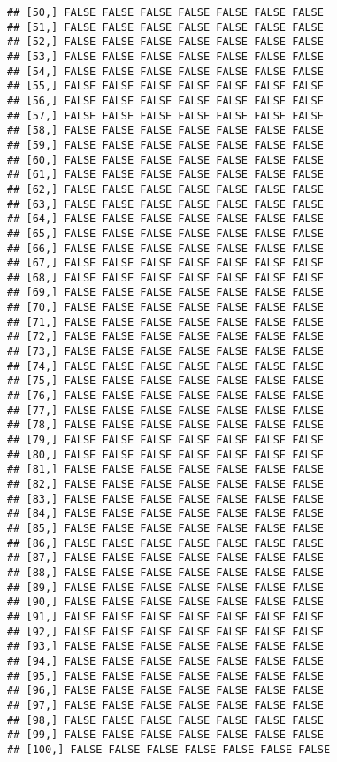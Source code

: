 \documentclass[
]{article}
\begin{document}
\begin{verbatim}
## [50,] FALSE FALSE FALSE FALSE FALSE FALSE FALSE
## [51,] FALSE FALSE FALSE FALSE FALSE FALSE FALSE
## [52,] FALSE FALSE FALSE FALSE FALSE FALSE FALSE
## [53,] FALSE FALSE FALSE FALSE FALSE FALSE FALSE
## [54,] FALSE FALSE FALSE FALSE FALSE FALSE FALSE
## [55,] FALSE FALSE FALSE FALSE FALSE FALSE FALSE
## [56,] FALSE FALSE FALSE FALSE FALSE FALSE FALSE
## [57,] FALSE FALSE FALSE FALSE FALSE FALSE FALSE
## [58,] FALSE FALSE FALSE FALSE FALSE FALSE FALSE
## [59,] FALSE FALSE FALSE FALSE FALSE FALSE FALSE
## [60,] FALSE FALSE FALSE FALSE FALSE FALSE FALSE
## [61,] FALSE FALSE FALSE FALSE FALSE FALSE FALSE
## [62,] FALSE FALSE FALSE FALSE FALSE FALSE FALSE
## [63,] FALSE FALSE FALSE FALSE FALSE FALSE FALSE
## [64,] FALSE FALSE FALSE FALSE FALSE FALSE FALSE
## [65,] FALSE FALSE FALSE FALSE FALSE FALSE FALSE
## [66,] FALSE FALSE FALSE FALSE FALSE FALSE FALSE
## [67,] FALSE FALSE FALSE FALSE FALSE FALSE FALSE
## [68,] FALSE FALSE FALSE FALSE FALSE FALSE FALSE
## [69,] FALSE FALSE FALSE FALSE FALSE FALSE FALSE
## [70,] FALSE FALSE FALSE FALSE FALSE FALSE FALSE
## [71,] FALSE FALSE FALSE FALSE FALSE FALSE FALSE
## [72,] FALSE FALSE FALSE FALSE FALSE FALSE FALSE
## [73,] FALSE FALSE FALSE FALSE FALSE FALSE FALSE
## [74,] FALSE FALSE FALSE FALSE FALSE FALSE FALSE
## [75,] FALSE FALSE FALSE FALSE FALSE FALSE FALSE
## [76,] FALSE FALSE FALSE FALSE FALSE FALSE FALSE
## [77,] FALSE FALSE FALSE FALSE FALSE FALSE FALSE
## [78,] FALSE FALSE FALSE FALSE FALSE FALSE FALSE
## [79,] FALSE FALSE FALSE FALSE FALSE FALSE FALSE
## [80,] FALSE FALSE FALSE FALSE FALSE FALSE FALSE
## [81,] FALSE FALSE FALSE FALSE FALSE FALSE FALSE
## [82,] FALSE FALSE FALSE FALSE FALSE FALSE FALSE
## [83,] FALSE FALSE FALSE FALSE FALSE FALSE FALSE
## [84,] FALSE FALSE FALSE FALSE FALSE FALSE FALSE
## [85,] FALSE FALSE FALSE FALSE FALSE FALSE FALSE
## [86,] FALSE FALSE FALSE FALSE FALSE FALSE FALSE
## [87,] FALSE FALSE FALSE FALSE FALSE FALSE FALSE
## [88,] FALSE FALSE FALSE FALSE FALSE FALSE FALSE
## [89,] FALSE FALSE FALSE FALSE FALSE FALSE FALSE
## [90,] FALSE FALSE FALSE FALSE FALSE FALSE FALSE
## [91,] FALSE FALSE FALSE FALSE FALSE FALSE FALSE
## [92,] FALSE FALSE FALSE FALSE FALSE FALSE FALSE
## [93,] FALSE FALSE FALSE FALSE FALSE FALSE FALSE
## [94,] FALSE FALSE FALSE FALSE FALSE FALSE FALSE
## [95,] FALSE FALSE FALSE FALSE FALSE FALSE FALSE
## [96,] FALSE FALSE FALSE FALSE FALSE FALSE FALSE
## [97,] FALSE FALSE FALSE FALSE FALSE FALSE FALSE
## [98,] FALSE FALSE FALSE FALSE FALSE FALSE FALSE
## [99,] FALSE FALSE FALSE FALSE FALSE FALSE FALSE
## [100,] FALSE FALSE FALSE FALSE FALSE FALSE FALSE

\end{verbatim}
\end{document}
